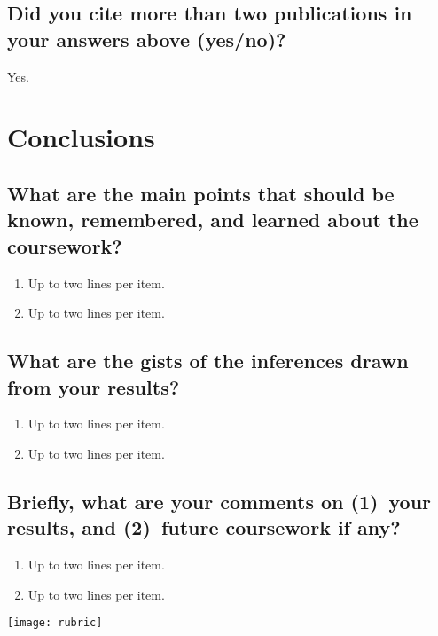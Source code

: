 \subsection{Did you cite more than two publications in your answers above (yes/no)?}
Yes.	



















\section{Conclusions}
\label{sec:conc}

\subsection{What are the main points that should be known, remembered, and learned about the coursework?}
\begin{enumerate}
	\item Up to two lines per item.
	\item Up to two lines per item.
\end{enumerate}

\subsection{What are the gists of the inferences drawn from your results?}
\begin{enumerate}
	\item Up to two lines per item.
	\item Up to two lines per item.
\end{enumerate}

\subsection{Briefly, what are your comments on (1)~your results, and  (2)~future coursework if any?}
\begin{enumerate}
	\item Up to two lines per item.
	\item Up to two lines per item.
\end{enumerate}	




\newpage
\begin{figure*}[!t]
	\texttt{[image: rubric]} 
\end{figure*}
\cleardoublepage

